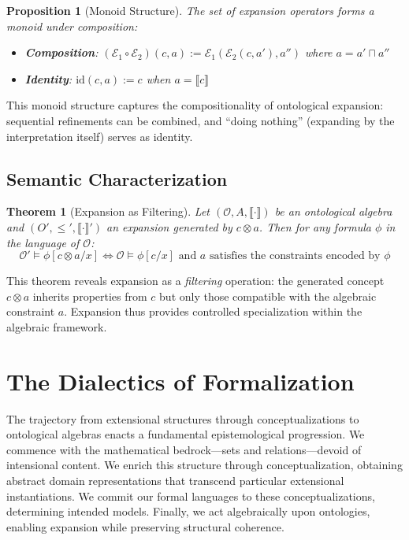 \documentclass[12pt,a4paper]{article}
\newtheorem{theorem}[definition]{Theorem}
\newtheorem{proposition}[definition]{Proposition}
\newcommand{\onto}{\mathcal{O}}
\newcommand{\sem}[1]{\llbracket #1 \rrbracket}
\begin{document}
\begin{proposition}[Monoid Structure]
The set of expansion operators forms a monoid under composition:
\begin{itemize}
    \item \textbf{Composition}: $(\mathcal{E}_1 \circ \mathcal{E}_2)(c, a) := \mathcal{E}_1(\mathcal{E}_2(c, a'), a'')$ where $a = a' \sqcap a''$
    \item \textbf{Identity}: $\text{id}(c, a) := c$ when $a = \sem{c}$
\end{itemize}
\end{proposition}

This monoid structure captures the compositionality of ontological expansion: sequential refinements can be combined, and ``doing nothing'' (expanding by the interpretation itself) serves as identity.

\subsection{Semantic Characterization}

\begin{theorem}[Expansion as Filtering]
Let $(\onto, A, \sem{\cdot})$ be an ontological algebra and $(O', \leq', \sem{\cdot}')$ an expansion generated by $c \otimes a$. Then for any formula $\phi$ in the language of $\onto$:
$$
\onto' \models \phi[c \otimes a / x] \iff \onto \models \phi[c/x] \text{ and } a \text{ satisfies the constraints encoded by } \phi
$$
\end{theorem}

This theorem reveals expansion as a \emph{filtering} operation: the generated concept $c \otimes a$ inherits properties from $c$ but only those compatible with the algebraic constraint $a$. Expansion thus provides controlled specialization within the algebraic framework.

\section{The Dialectics of Formalization}

The trajectory from extensional structures through conceptualizations to ontological algebras enacts a fundamental epistemological progression. We commence with the mathematical bedrock---sets and relations---devoid of intensional content. We enrich this structure through conceptualization, obtaining abstract domain representations that transcend particular extensional instantiations. We commit our formal languages to these conceptualizations, determining intended models. Finally, we act algebraically upon ontologies, enabling expansion while preserving structural coherence.
\end{document}
